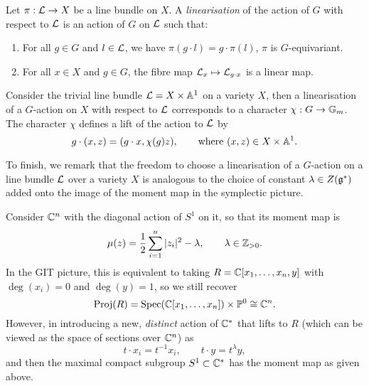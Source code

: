 \begin{defn}
	Let $\pi:\mathcal{L} \rightarrow X$ be a line bundle on $X$. A \emph{linearisation} of the action of $G$ with respect to $\mathcal{L}$ is an action of $G$ on $\mathcal{L}$ such that:
	\begin{enumerate}
		\item For all $g \in G$ and $l \in \mathcal{L}$, we have $\pi(g \cdot l) = g \cdot \pi(l)$, \ie $\pi$ is $G$-equivariant.
		\item For all $x \in X$ and $g \in G$, the fibre map $\mathcal{L}_{x} \mapsto \mathcal{L}_{g\cdot x}$ is a linear map.
	\end{enumerate}
\end{defn}

\begin{ex}
	Consider the trivial line bundle $\mathcal{L} = X \times \mathbb{A}^{1}$ on a variety $X$, then a linearisation of a $G$-action on $X$ with respect to $\mathcal{L}$ corresponds to a character $\chi: G \rightarrow \mathbb{G}_{m}$. The character $\chi$ defines a lift of the action to $\mathcal{L}$ by
	$$
	g \cdot (x,z) = (g\cdot x, \chi(g)z),\qquad \text{where } (x,z) \in X \times \mathbb{A}^{1}.
	$$
\end{ex}

To finish, we remark that the freedom to choose a linearisation of a $G$-action on a line bundle $\mathcal{L}$ over a variety $X$ is analogous to the choice of constant $\lambda \in Z(\mathfrak{g}^{\ast})$ added onto the image of the moment map in the symplectic picture.

\begin{ex}
	Consider $\mathbb{C}^{n}$ with the diagonal action of $S^{1}$ on it, so that its moment map is
	$$
		\mu(z) = \frac{1}{2}\sum_{i=1}^{n}|z_{i}|^{2} - \lambda, \qquad \lambda \in \mathbb{Z}_{>0}.
	$$
	In the GIT picture, this is equivalent to taking $R = \mathbb{C}[x_{1},\ldots, x_{n}, y]$ with $\deg(x_{i}) = 0$ and $\deg(y) = 1$, so we still recover
	$$
		\operatorname{Proj}(R) = \operatorname{Spec}(\mathbb{C}[x_{1},\ldots, x_{n}]) \times \mathbb{P}^{0} \cong \mathbb{C}^{n}.
	$$
	However, in introducing a new, \emph{distinct} action of $\mathbb{C}^{\ast}$ that lifts to $R$ (which can be viewed as the space of sections over $\mathbb{C}^{n}$) as
	$$
		t\cdot x_{i} = t^{-1}x_{i},\qquad t\cdot y = t^{\lambda}y,
	$$
	and then the maximal compact subgroup $S^{1} \subset \mathbb{C}^{\ast}$ has the moment map as given above.
\end{ex}
